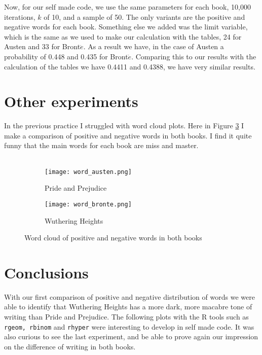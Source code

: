 \documentclass{article}
\begin{document}
Now, for our self made code, we use the same parameters for each book, 10,000 iterations, $k$ of 10, and a sample of 50. The only variants are the positive and negative words for each book. Something else we added was the limit variable, which is the same as we used to make our calculation with the tables, 24 for Austen and 33 for Bront$\ddot{e}$. As a result we have, in the case of Austen a probability of 0.448 and 0.435 for Bront$\ddot{e}$. Comparing this to our results with the calculation of the tables we have 0.4411 and 0.4388, we have very similar results. \\



\section{Other experiments}

In the previous practice I struggled with word cloud plots. Here in Figure \ref{fig0} I make a comparison of positive and negative words in both books. I find it quite funny that the main words for each book are miss and master.\\~\\



\begin{figure}[]
\begin{subfigure}{.5\textwidth}
  \centering
  \texttt{[image: word\_austen.png]}  
  \caption{Pride and Prejudice}
  \label{subfig0-1}
\end{subfigure}
\begin{subfigure}{.5\textwidth}
  \centering
  \texttt{[image: word\_bronte.png]}  
  \caption{Wuthering Heights}
  \label{subfig0-2}
\end{subfigure}
\caption{Word cloud of positive and negative words in both books}
\label{fig0}
\end{figure}


\section{Conclusions}

With our first comparison of positive and negative distribution of words we were able to identify that Wuthering Heights has a more dark, more macabre tone of writing than Pride and Prejudice. The following plots with the R tools such as \texttt{rgeom, rbinom} and \texttt{rhyper} were interesting to develop in self made code. It was also curious to see the last experiment, and be able to prove again our impression on the difference of writing in both books. \\
\end{document}
